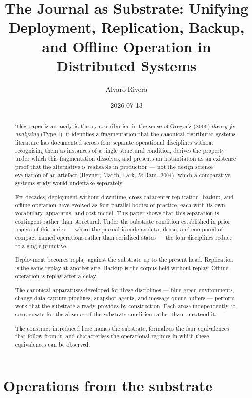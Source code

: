 \documentclass[
]{article}
\title{The Journal as Substrate: Unifying Deployment, Replication,
Backup, and Offline Operation in Distributed Systems}
\author{Alvaro Rivera}
\date{2026-07-13}
\begin{document}
\maketitle
\begin{abstract}
This paper is an analytic theory contribution in the sense of Gregor's
(2006) \emph{theory for analyzing} (Type I): it identifies a
fragmentation that the canonical distributed-systems literature has
documented across four separate operational disciplines without
recognising them as instances of a single structural condition, derives
the property under which this fragmentation dissolves, and presents an
instantiation as an existence proof that the alternative is realisable
in production --- not the design-science evaluation of an artefact
(Hevner, March, Park, \& Ram, 2004), which a comparative systems study
would undertake separately.

For decades, deployment without downtime, cross-datacenter replication,
backup, and offline operation have evolved as four parallel bodies of
practice, each with its own vocabulary, apparatus, and cost model. This
paper shows that this separation is contingent rather than structural.
Under the substrate condition established in prior papers of this series
--- where the journal is code-as-data, dense, and composed of compact
named operations rather than serialised states --- the four disciplines
reduce to a single primitive.

Deployment becomes replay against the substrate up to the present head.
Replication is the same replay at another site. Backup is the corpus
held without replay. Offline operation is replay after a delay.

The canonical apparatuses developed for these disciplines --- blue-green
environments, change-data-capture pipelines, snapshot agents, and
message-queue buffers --- perform work that the substrate already
provides by construction. Each arose independently to compensate for the
absence of the substrate condition rather than to extend it.

The construct introduced here names the substrate, formalises the four
equivalences that follow from it, and characterises the operational
regimes in which these equivalences can be observed.
\end{abstract}

\section{Operations from the
substrate}\label{operations-from-the-substrate}
\end{document}
